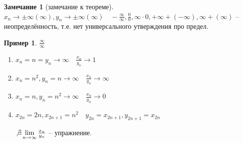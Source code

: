\documentclass{book}
\theoremstyle{definition}
\newtheorem*{note}{Замечание}
\newtheorem*{example}{Пример}
\begin{document}
    \begin{note}
    [замечание к теореме]
        $x_{n} \to \pm \infty (\infty ), y_{n} \to \pm \infty (\infty )\quad -\frac{\infty }{\infty }, \frac{0}{0}, \infty \cdot 0, +\infty +(-\infty ), \infty +(\infty )$ -- неопределённость, т.е. нет универсального утверждения про предел.
    \end{note}
    \begin{example}
        $\frac{\infty }{\infty }$

        \begin{enumerate}
            \item $x_{n} =n=y_{n} \to \infty  \quad \frac{x_{n} }{y_{n} } \to 1$
            \item $x_{n} =n^2, y_{n} =n \to \infty\quad \frac{x_{n} }{y_{n} } \to \infty  $
            \item $x_{n} =n, y_{n} =n^2 \to \infty \quad \frac{x_{n} }{y_{n} } \to  0$
            \item $x_{2n}=2n, x_{2n+1} = n^2\quad y_{2n} = x_{2n+1}, y_{2n+1} = x_{2n}$

            $\not \exists \lim_{n \to \infty} \frac{x_{n} }{y_{n} } $ -- упражнение.
        \end{enumerate}
    \end{example}
\end{document}
